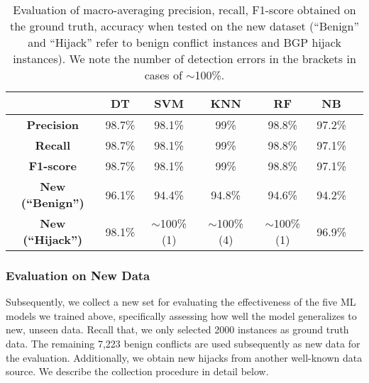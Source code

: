 \begin{table}[t!]
  \centering
  \fontsize{7}{7}\selectfont
  \renewcommand\arraystretch{1}{
\begin{tabular}{ccccccc}\toprule
 & \textbf{DT} & \textbf{SVM}  & \textbf{KNN} & \textbf{RF} & \textbf{NB}\\\midrule
 \textbf{Precision} & 98.7\% & 98.1\% &  99\% & 98.8\% & 97.2\% \\
 \textbf{Recall} & 98.7\% & 98.1\% & 99\% & 98.8\% & 97.1\% \\
 \textbf{F1-score}  & 98.7\%  & 98.1\% & 99\%  & 98.8\% & 97.1\% \\ \midrule
 \textbf{New (``Benign'')} & 96.1\% & 94.4\% & 94.8\% & 94.6\%  & 94.2\% \\
 \textbf{New (``Hijack'')} & 98.1\% & $\sim$100\% (1)  & $\sim$100\% (4) & $\sim$100\% (1) & 96.9\%  \\
\bottomrule
\end{tabular}
}
 \caption[Evaluation results of five ML models.]{\small %
 Evaluation of macro-averaging precision, recall, F1-score obtained on the ground truth, accuracy when tested on the new dataset (``Benign'' and ``Hijack'' refer to benign conflict instances and BGP hijack instances). We note the number of detection errors in the brackets in cases of $\sim$100\%.}
    \label{tab:lov_classifiers_res}
    \vspace{-15pt}
\end{table}
\vspace{-10pt}
\subsubsection{Evaluation on New Data} \label{subsec:holdout}
Subsequently, we collect a new set for evaluating the effectiveness of the five ML models we trained above, specifically assessing how well the model generalizes to new, unseen data.
Recall that, we only selected 2000 instances as ground truth data. The remaining 7,223 benign conflicts are used subsequently as new data for the evaluation.
Additionally, we obtain new hijacks from another well-known data source. We describe the collection procedure in detail below.

